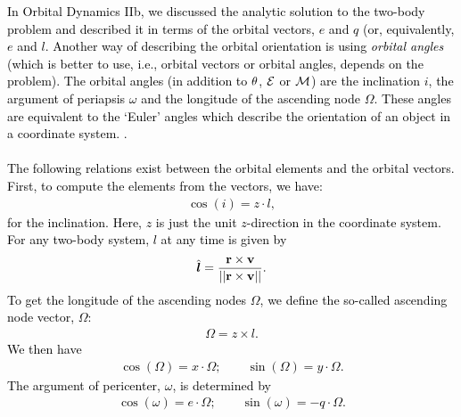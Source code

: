 \documentclass[main.tex]{subfiles}
\begin{document}
\begin{tcolorbox}[sharp corners, colback=green!30, colframe=green!80!blue, title=Orbital Dynamics IV$^7$]
\par \textcolor{black}{In Orbital Dynamics IIb, we discussed the analytic solution to the two-body problem and described it in terms of the orbital vectors, $\unit{e}$ and $\unit{q}$ (or, equivalently, $\unit{e}$ and $\unit{l}$. Another way of describing the orbital orientation is using {\it orbital angles} (which is better to use, i.e., orbital vectors or orbital angles, depends on the problem). The orbital angles (in addition to $\theta$, $\mathcal{E}$ or $\mathcal{M}$) are the inclination $i$, the argument of periapsis $\omega$ and the longitude of the ascending node $\Omega$. These angles are equivalent to the `Euler' angles which describe the orientation of an object in a coordinate system. . \\ \\
The following relations exist between the orbital elements and the orbital vectors. First, to compute the elements from the vectors, we have:
\begin{align}
\cos(i) = \unit{z} \cdot \unit{l},
\end{align}
for the inclination. Here, $\unit{z}$ is just the unit $z$-direction in the coordinate system. For any two-body system, $\unit{l}$ at any time is given by
\begin{align}
\hat{\boldsymbol{l}} = \frac{ {\mathbf{r}} \times {\mathbf{v}}}{||{\mathbf{r}} \times {\mathbf{v}} ||}.
\end{align}
To get the longitude of the ascending nodes $\Omega$, we define the so-called ascending node vector, $\unit{\Omega}$:
\begin{align}
\unit{\Omega} = \unit{z} \times \unit{l}.
\end{align}
We then have
\begin{align}
\cos(\Omega) = \unit{x} \cdot \unit{\Omega}; \qquad \sin(\Omega) = \unit{y} \cdot \unit{\Omega}.
\end{align}
The argument of pericenter, $\omega$, is determined by
\begin{align}
\cos(\omega) = \unit{e} \cdot \unit{\Omega}; \qquad \sin(\omega) = -\unit{q} \cdot \unit{\Omega}.
\end{align}
}
\end{tcolorbox}
\end{document}
